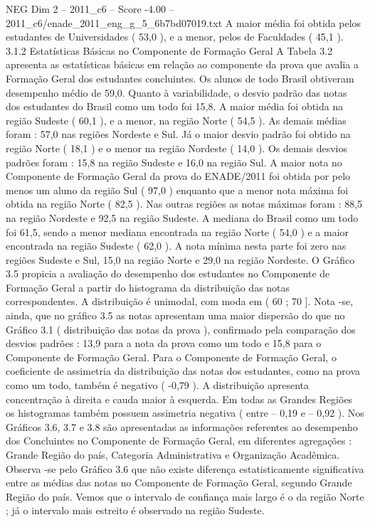 \begin{textsample}{NEG Dim 2 – 2011\_c6 – Score -4.00 – 2011\_c6/enade\_2011\_eng\_g\_5\_6b7bd07019.txt}
A maior média foi obtida pelos estudantes de Universidades ( 53,0 ), e a menor, pelos de Faculdades ( 45,1 ). 3.1.2 Estatísticas Básicas no Componente de Formação Geral A Tabela 3.2 apresenta as estatísticas básicas em relação ao componente da prova que avalia a Formação Geral dos estudantes concluintes.
Os alunos de todo Brasil obtiveram desempenho médio de 59,0.
Quanto à variabilidade, o desvio padrão das notas dos estudantes do Brasil como um todo foi 15,8.
A maior média foi obtida na região Sudeste ( 60,1 ), e a menor, na região Norte ( 54,5 ).
As demais médias foram : 57,0 nas regiões Nordeste e Sul.
Já o maior desvio padrão foi obtido na região Norte ( 18,1 ) e o menor na região Nordeste ( 14,0 ).
Os demais desvios padrões foram : 15,8 na região Sudeste e 16,0 na região Sul.
A maior nota no Componente de Formação Geral da prova do ENADE/2011 foi obtida por pelo menos um aluno da região Sul ( 97,0 ) enquanto que a menor nota máxima foi obtida na região Norte ( 82,5 ).
Nas outras regiões as notas máximas foram : 88,5 na região Nordeste e 92,5 na região Sudeste.
A mediana do Brasil como um todo foi 61,5, sendo a menor mediana encontrada na região Norte ( 54,0 ) e a maior encontrada na região Sudeste ( 62,0 ).
A nota mínima nesta parte foi zero nas regiões Sudeste e Sul, 15,0 na região Norte e 29,0 na região Nordeste.
O Gráfico 3.5 propicia a avaliação do desempenho dos estudantes no Componente de Formação Geral a partir do histograma da distribuição das notas correspondentes.
A distribuição é unimodal, com moda em ( 60 ; 70 ].
Nota -se, ainda, que no gráfico 3.5 as notas apresentam uma maior dispersão do que no Gráfico 3.1 ( distribuição das notas da prova ), confirmado pela comparação dos desvios padrões : 13,9 para a nota da prova como um todo e 15,8 para o Componente de Formação Geral.
Para o Componente de Formação Geral, o coeficiente de assimetria da distribuição das notas dos estudantes, como na prova como um todo, também é negativo ( -0,79 ).
A distribuição apresenta concentração à direita e cauda maior à esquerda.
Em todas as Grandes Regiões os histogramas também possuem assimetria negativa ( entre – 0,19 e – 0,92 ).
Nos Gráficos 3.6, 3.7 e 3.8 são apresentadas as informações referentes ao desempenho dos Concluintes no Componente de Formação Geral, em diferentes agregações : Grande Região do país, Categoria Administrativa e Organização Acadêmica.
Observa -se pelo Gráfico 3.6 que não existe diferença estatisticamente significativa entre as médias das notas no Componente de Formação Geral, segundo Grande Região do país.
Vemos que o intervalo de confiança mais largo é o da região Norte ; já o intervalo mais estreito é observado na região Sudeste.

\end{textsample}
